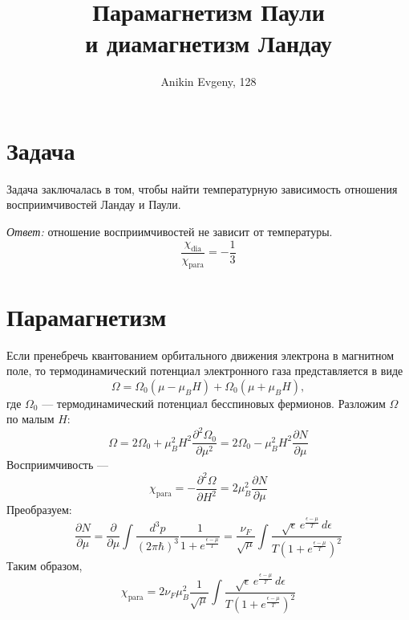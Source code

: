 \documentclass{article}
\title{Парамагнетизм Паули \\и диамагнетизм Ландау}
\author{Anikin Evgeny, 128}
\begin{document}
\maketitle
\section{Задача}
Задача заключалась в том, чтобы найти температурную зависимость отношения 
восприимчивостей Ландау и Паули. 

\emph{Ответ:} отношение восприимчивостей не зависит от температуры.
\begin{equation}
    \frac{\chi_\mathrm{dia}}{\chi_\mathrm{para}} = -\frac{1}{3}
\end{equation}
\section{Парамагнетизм}
Если пренебречь квантованием орбитального движения электрона в магнитном поле, то
термодинамический потенциал электронного газа представляется в виде
\begin{equation}
    \Omega = \Omega_0(\mu - \mu_B H) + \Omega_0(\mu + \mu_B H),
\end{equation}
где $\Omega_0$ --- термодинамический потенциал бесспиновых фермионов. Разложим $\Omega$ по 
малым $H$: 
\begin{equation}
    \Omega = 2\Omega_0 + \mu_B^2 H^2 \frac{\partial^2 \Omega_0}{\partial \mu^2} = 
            2\Omega_0 - \mu_B^2 H^2 \frac{\partial N}{\partial \mu}
\end{equation}
Восприимчивость --- 
\begin{equation}
    \chi_{\mathrm{para}} = -\frac{\partial^2 \Omega}{\partial H^2} =  
        2\mu_B^2 \frac{\partial N}{\partial \mu}
\end{equation}
Преобразуем:
\begin{equation}
    \frac{\partial N}{\partial \mu} = 
        \frac{\partial}{\partial \mu}
              \int \frac{d^3 p}{(2\pi\hbar)^3}\frac{1}{1 + e^{\frac{\epsilon - \mu}{T}}} =
        \frac{\nu_F}{\sqrt{\mu}} 
                \int \frac{\sqrt{\epsilon}\, e^{\frac{\epsilon-\mu}{T}} \,d\epsilon}
                          {T\left(1 + e^{\frac{\epsilon-\mu}{T}}\right)^2}
\end{equation}
Таким образом,
\begin{equation}
    \label{para}
    \chi_{\mathrm{para}} = 2\nu_F\mu_B^2
        \frac{1}{\sqrt{\mu}} 
                \int \frac{\sqrt{\epsilon}\, e^{\frac{\epsilon-\mu}{T}} \,d\epsilon}
                          {T\left(1 + e^{\frac{\epsilon-\mu}{T}}\right)^2}
\end{equation}
\end{document}
